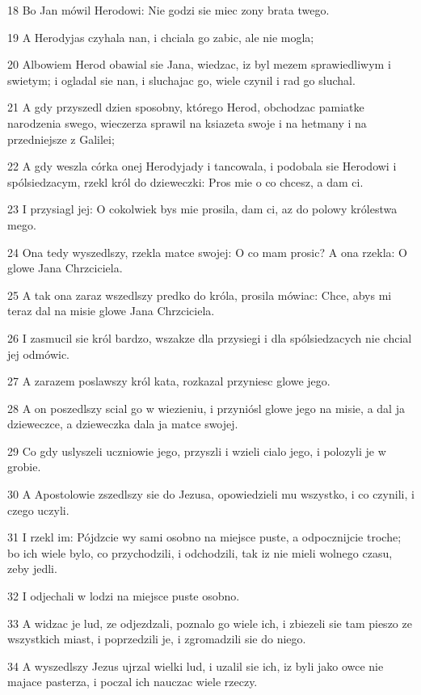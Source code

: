 \par 18 Bo Jan mówil Herodowi: Nie godzi sie miec zony brata twego.
\par 19 A Herodyjas czyhala nan, i chciala go zabic, ale nie mogla;
\par 20 Albowiem Herod obawial sie Jana, wiedzac, iz byl mezem sprawiedliwym i swietym; i ogladal sie nan, i sluchajac go, wiele czynil i rad go sluchal.
\par 21 A gdy przyszedl dzien sposobny, którego Herod, obchodzac pamiatke narodzenia swego, wieczerza sprawil na ksiazeta swoje i na hetmany i na przedniejsze z Galilei;
\par 22 A gdy weszla córka onej Herodyjady i tancowala, i podobala sie Herodowi i spólsiedzacym, rzekl król do dzieweczki: Pros mie o co chcesz, a dam ci.
\par 23 I przysiagl jej: O cokolwiek bys mie prosila, dam ci, az do polowy królestwa mego.
\par 24 Ona tedy wyszedlszy, rzekla matce swojej: O co mam prosic? A ona rzekla: O glowe Jana Chrzciciela.
\par 25 A tak ona zaraz wszedlszy predko do króla, prosila mówiac: Chce, abys mi teraz dal na misie glowe Jana Chrzciciela.
\par 26 I zasmucil sie król bardzo, wszakze dla przysiegi i dla spólsiedzacych nie chcial jej odmówic.
\par 27 A zarazem poslawszy król kata, rozkazal przyniesc glowe jego.
\par 28 A on poszedlszy scial go w wiezieniu, i przyniósl glowe jego na misie, a dal ja dzieweczce, a dzieweczka dala ja matce swojej.
\par 29 Co gdy uslyszeli uczniowie jego, przyszli i wzieli cialo jego, i polozyli je w grobie.
\par 30 A Apostolowie zszedlszy sie do Jezusa, opowiedzieli mu wszystko, i co czynili, i czego uczyli.
\par 31 I rzekl im: Pójdzcie wy sami osobno na miejsce puste, a odpocznijcie troche; bo ich wiele bylo, co przychodzili, i odchodzili, tak iz nie mieli wolnego czasu, zeby jedli.
\par 32 I odjechali w lodzi na miejsce puste osobno.
\par 33 A widzac je lud, ze odjezdzali, poznalo go wiele ich, i zbiezeli sie tam pieszo ze wszystkich miast, i poprzedzili je, i zgromadzili sie do niego.
\par 34 A wyszedlszy Jezus ujrzal wielki lud, i uzalil sie ich, iz byli jako owce nie majace pasterza, i poczal ich nauczac wiele rzeczy.
